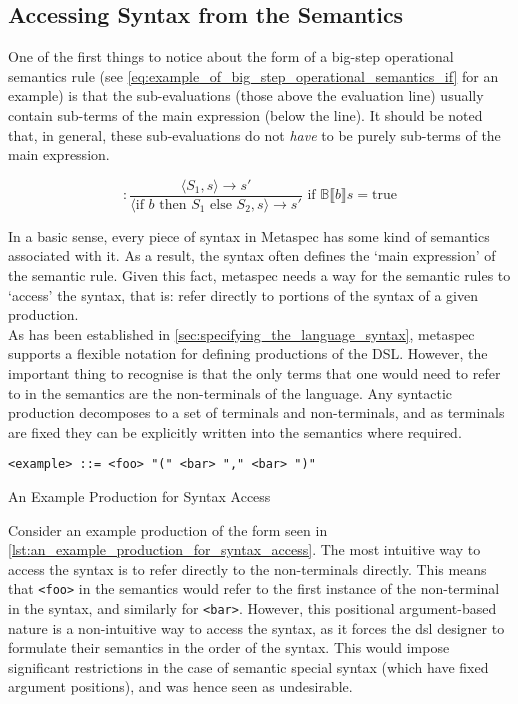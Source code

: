 \subsection{Accessing Syntax from the Semantics} %
\label{sub:accessing_syntax_from_the_semantics}
One of the first things to notice about the form of a big-step operational semantics rule (see \autoref{eq:example_of_big_step_operational_semantics_if} for an example) is that the sub-evaluations (those above the evaluation line) usually contain sub-terms of the main expression (below the line).
It should be noted that, in general, these sub-evaluations do not \textit{have} to be purely sub-terms of the main expression. 

\begin{equation}
    [\text{if}] : \frac{\langle S_1, s \rangle \to s'}{\langle \text{if } b \text{ then } S_1 \text{ else } S_2, s\rangle \to s'} \text{ if } \mathbb{B}\llbracket b \rrbracket s = \text{true}
    \label{eq:example_of_big_step_operational_semantics_if}
\end{equation}

In a basic sense, every piece of syntax in Metaspec has some kind of semantics associated with it.
As a result, the syntax often defines the `main expression' of the semantic rule.
Given this fact, \gls{metaspec} needs a way for the semantic rules to `access' the syntax, that is: refer directly to portions of the syntax of a given production. \\

As has been established in \autoref{sec:specifying_the_language_syntax}, \gls{metaspec} supports a flexible notation for defining productions of the DSL. 
However, the important thing to recognise is that the only terms that one would need to refer to in the semantics are the non-terminals of the language. 
Any syntactic production decomposes to a set of terminals and non-terminals, and as terminals are fixed they can be explicitly written into the semantics where required. \\

\begin{listing}[!htb]
\begin{verbatim}
<example> ::= <foo> "(" <bar> "," <bar> ")"
\end{verbatim}
\caption{An Example Production for Syntax Access}
\label{lst:an_example_production_for_syntax_access}
\end{listing}

Consider an example production of the form seen in \autoref{lst:an_example_production_for_syntax_access}. 
The most intuitive way to access the syntax is to refer directly to the non-terminals directly.
This means that \texttt{<foo>} in the semantics would refer to the first instance of the non-terminal in the syntax, and similarly for \texttt{<bar>}.
However, this positional argument-based nature is a non-intuitive way to access the syntax, as it forces the \gls{dsl} designer to formulate their semantics in the order of the syntax. 
This would impose significant restrictions in the case of semantic special syntax (which have fixed argument positions), and was hence seen as undesirable.\\

